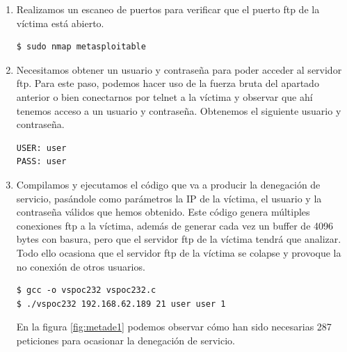\documentclass[a4,12pt,onecolum]{article}
\begin{document}
\begin{enumerate}
	\item Realizamos un escaneo de puertos para verificar que el puerto ftp de la víctima está abierto.

\begin{verbatim}
$ sudo nmap metasploitable
\end{verbatim}

	\item Necesitamos obtener un usuario y contraseña para poder acceder al servidor ftp. Para este paso, podemos hacer uso de la fuerza bruta del apartado anterior o bien conectarnos por telnet a la víctima y observar que ahí tenemos acceso a un usuario y contraseña. Obtenemos el siguiente usuario y contraseña.

\begin{verbatim}
USER: user
PASS: user
\end{verbatim}

	\item Compilamos y ejecutamos el código que va a producir la denegación de servicio, pasándole como parámetros la IP de la víctima, el usuario y la contraseña válidos que hemos obtenido. Este código genera múltiples conexiones ftp a la víctima, además de generar cada vez un buffer de 4096 bytes con basura, pero que el servidor ftp de la víctima tendrá que analizar. Todo ello ocasiona que el servidor ftp de la víctima se colapse y provoque la no conexión de otros usuarios.

\begin{verbatim}
$ gcc -o vspoc232 vspoc232.c
$ ./vspoc232 192.168.62.189 21 user user 1
\end{verbatim}

    En la figura \ref{fig:metade1} podemos observar cómo han sido necesarias 287 peticiones para ocasionar la denegación de servicio.

    


\end{enumerate}
\end{document}
